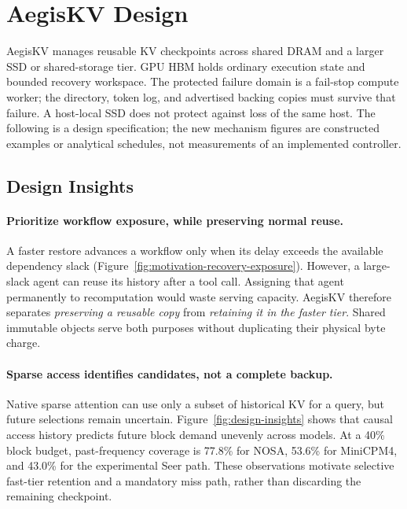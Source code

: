\section{AegisKV Design}
\label{sec:design}

AegisKV manages reusable KV checkpoints across shared DRAM and a larger
SSD or shared-storage tier. GPU HBM holds ordinary execution state and
bounded recovery workspace. The protected failure domain is a fail-stop
compute worker; the directory, token log, and advertised backing copies
must survive that failure. A host-local SSD does not protect against loss
of the same host. The following is a design specification; the new
mechanism figures are constructed examples or analytical schedules, not
measurements of an implemented controller.

\subsection{Design Insights}
\label{sec:design-insights}

\paragraph{Prioritize workflow exposure, while preserving normal reuse.}
A faster restore advances a workflow only when its delay exceeds the
available dependency slack (Figure~\ref{fig:motivation-recovery-exposure}).
However, a large-slack agent can reuse its history after a tool call.
Assigning that agent permanently to recomputation would waste serving
capacity. AegisKV therefore separates \emph{preserving a reusable copy}
from \emph{retaining it in the faster tier}. Shared immutable objects
serve both purposes without duplicating their physical byte charge.

\paragraph{Sparse access identifies candidates, not a complete backup.}
Native sparse attention can use only a subset of historical KV for a
query, but future selections remain uncertain. Figure~\ref{fig:design-insights}
shows that causal access history predicts future block demand unevenly
across models. At a 40\% block budget, past-frequency coverage is 77.8\%
for NOSA, 53.6\% for MiniCPM4, and 43.0\% for the experimental Seer path.
These observations motivate selective fast-tier retention and a mandatory
miss path, rather than discarding the remaining checkpoint.

